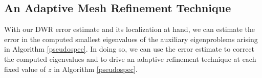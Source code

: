 



\subsection{An Adaptive Mesh Refinement Technique} \label{AMR}

With our DWR error estimate and its localization at hand, we can estimate the error in the computed smallest eigenvalues of the auxiliary eigenproblems arising in Algorithm \ref{pseudospec}. In doing so, we can use the error estimate to correct the computed eigenvalues and to drive an adaptive refinement technique at each fixed value of $z$ in Algorithm \ref{pseudospec}.

